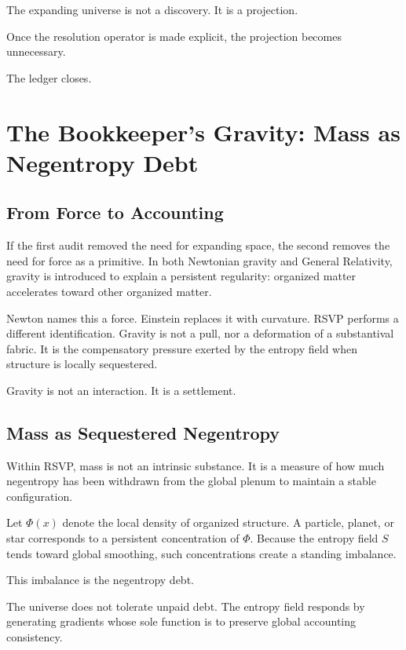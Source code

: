 \documentclass[11pt]{book}
\begin{document}
The expanding universe is not a discovery. It is a projection.

Once the resolution operator is made explicit, the projection becomes unnecessary.

The ledger closes.


\chapter{The Bookkeeper’s Gravity: Mass as Negentropy Debt}

\section{From Force to Accounting}

If the first audit removed the need for expanding space, the second removes the need for force as a primitive. In both Newtonian gravity and General Relativity, gravity is introduced to explain a persistent regularity: organized matter accelerates toward other organized matter.

Newton names this a force. Einstein replaces it with curvature. RSVP performs a different identification. Gravity is not a pull, nor a deformation of a substantival fabric. It is the compensatory pressure exerted by the entropy field when structure is locally sequestered.

Gravity is not an interaction. It is a settlement.

\section{Mass as Sequestered Negentropy}

Within RSVP, mass is not an intrinsic substance. It is a measure of how much negentropy has been withdrawn from the global plenum to maintain a stable configuration.

Let \(\Phi(x)\) denote the local density of organized structure. A particle, planet, or star corresponds to a persistent concentration of \(\Phi\). Because the entropy field \(S\) tends toward global smoothing, such concentrations create a standing imbalance.

This imbalance is the negentropy debt.

The universe does not tolerate unpaid debt. The entropy field responds by generating gradients whose sole function is to preserve global accounting consistency.
\end{document}

